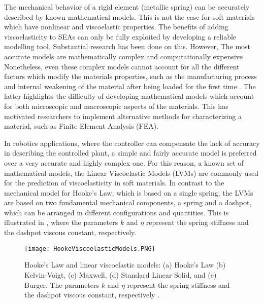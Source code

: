 The mechanical behavior of a rigid element (metallic spring) can be accurately described by known mathematical models. This is not the case for soft materials which have nonlinear and viscoelastic properties. The benefits of adding viscoelasticity to SEAs can only be fully exploited by developing a  reliable modelling tool. Substantial research has been done on this. However, The most accurate models are mathematically complex and computationally expensive \cite{xu2014mathematical,ciniello2017identifying,lu2017constitutive}. Nonetheless, even these complex models cannot account for all the different  factors which modify the materials properties, such as the manufacturing process and internal weakening of the material after being loaded for the first time \cite{case2015soft}. The latter highlights the difficulty of developing mathematical models which account for both microscopic and macroscopic aspects of the materials. This has motivated researchers to implement alternative methods for characterizing a material, such as Finite Element Analysis (FEA).

In robotics applications, where the controller can compensate the lack of accuracy in describing the controlled plant, a simple and fairly accurate model is preferred over a very accurate and highly complex one. For this reason, a known set of mathematical models, the Linear Viscoelastic Models (LVMs) are commonly used for the prediction of viscoelasticity in soft materials. In contrast to the mechanical model for Hooke's Law, which is based on a single spring, the LVMs are based on two fundamental mechanical components, a spring and a dashpot, which can be arranged in different configurations and quantities. This is illustrated in , where the parameters $k$ and $\eta$ represent the spring stiffness and the dashpot viscous constant, respectively.

\begin{figure}[hbt!]
	\centering
    \texttt{[image: HookeViscoelasticModels.PNG]}
    \caption{Hooke's Law and linear viscoelastic models: (a) Hooke's Law (b) Kelvin-Voigt, (c) Maxwell, (d) Standard Linear Solid, and (e) Burger. The parameters $k$ and $\eta$ represent the spring stiffness and the dashpot viscous constant, respectively \cite{austin2015control}. }
    \label{fig:LinearViscoelasticModels}
\end{figure}

